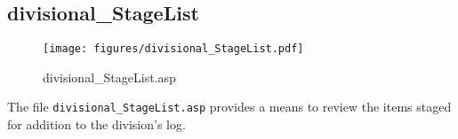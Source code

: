 \subsection{divisional\_StageList}
\begin{figure}[htb]
    \begin{center}
        \texttt{[image: figures/divisional\_StageList.pdf]}
    \end{center}
    \caption{divisional\_StageList.asp}
    \label{fig:divisional_StageList}
\end{figure}

The file \verb|divisional_StageList.asp| provides a means to review the items
staged for addition to the division's log.
